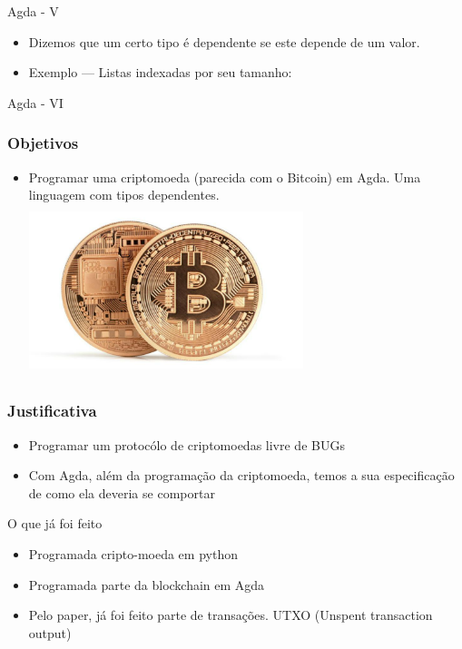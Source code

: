 \documentclass{beamer}
\begin{document}
       \begin{frame}{Agda - V}
         \begin{itemize}
           \item Dizemos que um certo tipo é dependente se este depende de um valor.
           \item Exemplo --- Listas indexadas por seu tamanho:
         \end{itemize}
\end{frame}

       \begin{frame}{Agda - VI}
	\begin{adjustwidth}{-3.5em}{-2em} \fontsize{8}{11}
	\end{adjustwidth}
\end{frame}
 
 \begin{frame}
\frametitle{Objetivos}
\begin{itemize}
    \item Programar uma criptomoeda (parecida com o Bitcoin) em Agda. Uma linguagem com tipos dependentes.
    \includegraphics[width=8cm, height=5cm]{TwoBitcoins}
\end{itemize}
\end{frame}

 \begin{frame}
\frametitle{Justificativa}
\begin{itemize}
    \item Programar um protocólo de criptomoedas livre de BUGs
    \item Com Agda, além da programação da criptomoeda, temos a sua especificação de como ela deveria se comportar
\end{itemize}
\end{frame}

  \begin{frame}{O que já foi feito}
    \begin{itemize}
        \item Programada cripto-moeda em python
        \item Programada parte da blockchain em Agda
        \item Pelo paper, já foi feito parte de transações. UTXO (Unspent transaction output)
    \end{itemize}
  \end{frame}
  
\end{document}
